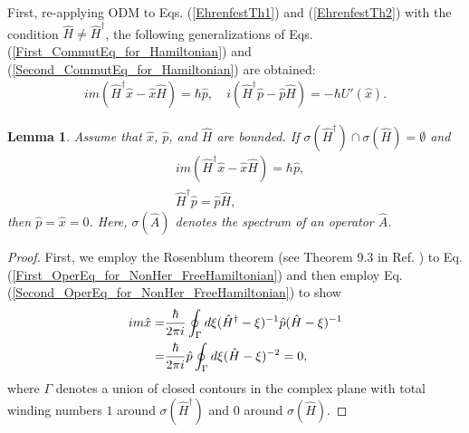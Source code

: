 \documentclass[twocolumn,pra,aps,showpacs,preprintnumbers,nofootinbib, superscriptaddress, amsmath,amssymb]{revtex4}
\newtheorem{lemma}{Lemma}
\begin{document}
First, re-applying ODM to Eqs. (\ref{EhrenfestTh1}) and (\ref{EhrenfestTh2}) with the condition $\hat{H} \neq \hat{H}^{\dagger}$, the following generalizations of Eqs. (\ref{First_CommutEq_for_Hamiltonian}) and (\ref{Second_CommutEq_for_Hamiltonian}) are obtained:
\begin{align}
	im ( \hat{H}^{\dagger} \hat{x} - \hat{x} \hat{H} ) = \hbar \hat{p}, \quad 
	i (  \hat{H}^{\dagger} \hat{p} - \hat{p} \hat{H} ) = -\hbar U'(\hat{x}).   
\end{align}
\begin{lemma}\label{NonHermitian_Lemma1}
	Assume that $\hat{x}$, $\hat{p}$, and $\hat{H}$ are bounded. If $\sigma(\hat{H}^{\dagger}) \cap \sigma(\hat{H}) = \emptyset$ and
	\begin{align}
		& im ( \hat{H}^{\dagger} \hat{x} - \hat{x} \hat{H} ) = \hbar \hat{p}, \label{First_OperEq_for_NonHer_FreeHamiltonian} \\
		& \hat{H}^{\dagger} \hat{p} = \hat{p} \hat{H}, \label{Second_OperEq_for_NonHer_FreeHamiltonian}
	\end{align}
	then $\hat{p} = \hat{x} = 0$. Here, $\sigma(\hat{A})$ denotes the spectrum of an operator $\hat{A}$.
\end{lemma}
\begin{proof}
	First, we employ the Rosenblum theorem \cite{Rosenblum1956} (see Theorem 9.3 in Ref. \cite{Bhatia1997}) to Eq. (\ref{First_OperEq_for_NonHer_FreeHamiltonian}) and then employ Eq. (\ref{Second_OperEq_for_NonHer_FreeHamiltonian}) to show 
	\begin{align}
		im\hat{x} =& \frac{\hbar}{2\pi i} \oint_{\Gamma} d\xi ( \hat{H}^{\dagger} - \xi )^{-1} \hat{p} ( \hat{H} - \xi )^{-1} \notag\\
			=&  \frac{\hbar}{2\pi i} \hat{p} \oint_{\Gamma} d\xi ( \hat{H} - \xi )^{-2}  = 0,
	\end{align}
	where $\Gamma$ denotes a union of closed contours in the complex plane with total winding numbers $1$ around $\sigma(\hat{H}^{\dagger})$ and $0$ around $\sigma(\hat{H})$.	
\end{proof}
\end{document}
